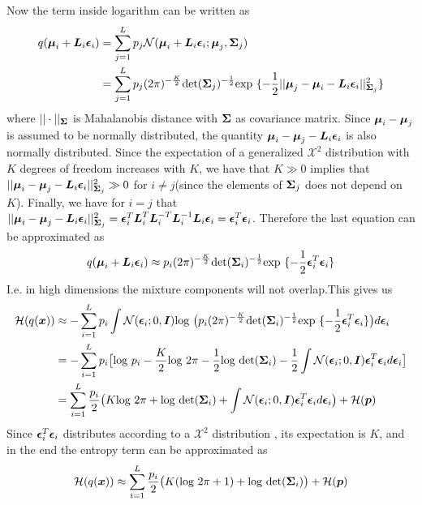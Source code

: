 Now the term inside logarithm can be written as 
\[
\begin{aligned}
q(\boldsymbol \mu_{i} + \boldsymbol L_{i}\boldsymbol \epsilon_{i}) &= \sum_{j=1}^{L} p_{j} \mathcal N(\boldsymbol \mu_{i}+\boldsymbol L_{i}\boldsymbol \epsilon_{i}; \boldsymbol \mu_{j}, \boldsymbol \Sigma_{j}) \\
&=\sum_{j=1}^{L}p_{j}(2\pi)^{-\frac{K}{2}} \text{det}(\boldsymbol \Sigma_{j})^{-\frac{1}{2}}\text{exp }\{-\frac{1}{2}||\boldsymbol \mu_{j} - \boldsymbol \mu_{i} - \boldsymbol L_{i} \boldsymbol \epsilon_{i}||^{2}_{\boldsymbol \Sigma_{j}}\}
\end{aligned}
\]
where $||\cdot||_{\boldsymbol \Sigma}$ is Mahalanobis distance with $\boldsymbol \Sigma$ as covariance matrix. Since $\boldsymbol \mu_{i} - \boldsymbol \mu_{j}$ is assumed to be normally distributed, the quantity $\boldsymbol \mu_i - \boldsymbol \mu_{j} - \boldsymbol L_{i} \boldsymbol \epsilon_{i} $ is also normally distributed. Since the expectation of a generalized $\mathcal X^{2}$ distribution with $K$ degrees of freedom increases with $K$, we have that $K \gg 0$ implies that $||\boldsymbol \mu_i - \boldsymbol \mu_{j} - \boldsymbol L_{i} \boldsymbol \epsilon_{i} ||^{2}_{\boldsymbol \Sigma_{j}} \gg 0 $ for $i \neq j$(since the elements of $\boldsymbol \Sigma_{j}$ does not depend on $K$). Finally, we have for $i=j$ that  $||\boldsymbol \mu_i - \boldsymbol \mu_{j} - \boldsymbol L_{i} \boldsymbol \epsilon_{i} ||^{2}_{\boldsymbol \Sigma_{j}} = \boldsymbol \epsilon_{i}^{T} \boldsymbol L_{i}^{T} \boldsymbol L_{i}^{-T} \boldsymbol L_{i}^{-1} \boldsymbol L_{i} \boldsymbol \epsilon_{i} = \boldsymbol \epsilon_{i}^{T} \boldsymbol \epsilon_{i}$. Therefore the last equation can be approximated as 
\[
q(\boldsymbol \mu_{i} + \boldsymbol L_{i} \boldsymbol \epsilon_{i}) \approx p_{i}(2\pi)^{-\frac{K}{2}}\text{det}(\boldsymbol \Sigma_{i})^{-\frac{1}{2}}\text{exp }\{-\frac{1}{2}\boldsymbol \epsilon_{i}^{T} \boldsymbol \epsilon_{i}\}
\]
I.e. in high dimensions the mixture components will not overlap.This gives us 
\[
\begin{aligned}
\mathcal H(q(\boldsymbol x)) & \approx -\sum_{i=1}^{L} p_{i}\int \mathcal N(\boldsymbol \epsilon_{i}; 0, \boldsymbol I) \text{log } \big(p_{i}(2\pi)^{-\frac{K}{2}}\text{det}(\boldsymbol \Sigma_{i})^{-\frac{1}{2}}\text{exp }\{-\frac{1}{2}\boldsymbol \epsilon_{i}^{T} \boldsymbol \epsilon_{i}\}\big) d\boldsymbol \epsilon_{i} \\ 
&= -\sum_{i=1}^{L}p_{i}\big[\text{log }p_{i} - \frac{K}{2}\text{log }2\pi  - \frac{1}{2} \text{log }\text{det}(\boldsymbol \Sigma_{i}) - \frac{1}{2}\int \mathcal N(\boldsymbol \epsilon_{i}; 0, \boldsymbol I)\boldsymbol \epsilon_{i}^{T} \boldsymbol \epsilon_{i} d \boldsymbol \epsilon_{i}\big] \\
&=\sum_{i=1}^{L}\frac{p_{i}}{2}\big(K\text{log }2\pi + \text{log } \text{det}(\boldsymbol \Sigma_{i}) + \int \mathcal N(\boldsymbol \epsilon_{i};0, \boldsymbol I)\boldsymbol \epsilon_{i}^{T}\boldsymbol \epsilon_{i}d\boldsymbol \epsilon_{i} \big) + \mathcal H(\boldsymbol p)
\end{aligned}
\] 
Since $\boldsymbol \epsilon_{i}^{T}\boldsymbol \epsilon_{i}$ distributes according to a $\mathcal X^{2}$ distribution , its expectation is $K$, and in the end the entropy term can be approximated as 
\[
\mathcal H(q(\boldsymbol x)) \approx \sum_{i=1}^{L}\frac{p_{i}}{2}\big(K(\text{log }2\pi + 1) + \text{log } \text{det}(\boldsymbol \Sigma_{i}) \big) + \mathcal H(\boldsymbol p)
\]

